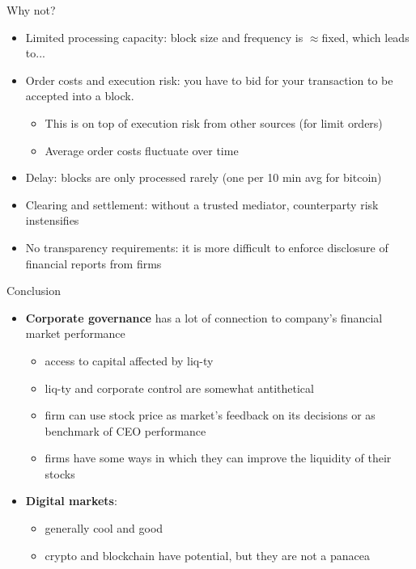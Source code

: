 \documentclass[english,10pt
,aspectratio=169
]{beamer}
\begin{document}
\begin{frame}[label=problems]{Why not?}
	\begin{itemize}
		\item \alert{Limited processing capacity}: block size and frequency is $\approx$fixed, which leads to...
		\item \alert{Order costs} and \alert{execution risk}: you have to bid for your transaction to be accepted into a block.
		\begin{itemize}
			\item This is on top of execution risk from other sources (for limit orders)
			\item Average order costs fluctuate over time \hyperlink{problems}{}
		\end{itemize}
		\item \alert{Delay}: blocks are only processed rarely (one per 10 min avg for bitcoin)
		\item \alert{Clearing and settlement}: without a trusted mediator, counterparty risk instensifies
		\item \alert{No transparency requirements}: it is more difficult to enforce disclosure of financial reports from firms
	\end{itemize}
\end{frame}


\begin{frame}{Conclusion}
	\begin{itemize}
		\item \textbf{Corporate governance} has a lot of connection to company's financial market performance
		\begin{itemize}
			\item access to capital affected by liq-ty
			\item liq-ty and corporate control are somewhat antithetical
			\item firm can use stock price as market's feedback on its decisions or as benchmark of CEO performance
			\item firms have some ways in which they can improve the liquidity of their stocks
		\end{itemize}
		\item \textbf{Digital markets}:
		\begin{itemize}
			\item generally cool and good
			\item crypto and blockchain have potential, but they are not a panacea
		\end{itemize}
	\end{itemize}
\end{frame}
\end{document}
